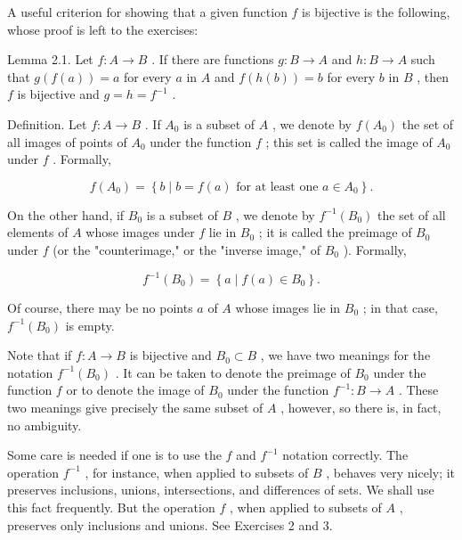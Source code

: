 A useful criterion for showing that a given function \(f\) is bijective is the following, whose proof is left to the exercises:

Lemma 2.1. Let \(f : A \rightarrow  B\) . If there are functions \(g : B \rightarrow  A\) and \(h : B \rightarrow  A\) such that \(g\left( {f\left( a\right) }\right)  = a\) for every \(a\) in \(A\) and \(f\left( {h\left( b\right) }\right)  = b\) for every \(b\) in \(B\) , then \(f\) is bijective and \(g = h = {f}^{-1}\) .

Definition. Let \(f : A \rightarrow  B\) . If \({A}_{0}\) is a subset of \(A\) , we denote by \(f\left( {A}_{0}\right)\) the set of all images of points of \({A}_{0}\) under the function \(f\) ; this set is called the image of \({A}_{0}\) under \(f\) . Formally,

\[
f\left( {A}_{0}\right)  = \left\{  {b \mid  b = f\left( a\right) \text{ for at least one }a \in  {A}_{0}}\right\}  .
\]

On the other hand, if \({B}_{0}\) is a subset of \(B\) , we denote by \({f}^{-1}\left( {B}_{0}\right)\) the set of all elements of \(A\) whose images under \(f\) lie in \({B}_{0}\) ; it is called the preimage of \({B}_{0}\) under \(f\) (or the "counterimage," or the "inverse image," of \({B}_{0}\) ). Formally,

\[
{f}^{-1}\left( {B}_{0}\right)  = \left\{  {a \mid  f\left( a\right)  \in  {B}_{0}}\right\}  .
\]

Of course, there may be no points \(a\) of \(A\) whose images lie in \({B}_{0}\) ; in that case, \({f}^{-1}\left( {B}_{0}\right)\) is empty.

Note that if \(f : A \rightarrow  B\) is bijective and \({B}_{0} \subset  B\) , we have two meanings for the notation \({f}^{-1}\left( {B}_{0}\right)\) . It can be taken to denote the preimage of \({B}_{0}\) under the function \(f\) or to denote the image of \({B}_{0}\) under the function \({f}^{-1} : B \rightarrow  A\) . These two meanings give precisely the same subset of \(A\) , however, so there is, in fact, no ambiguity.

Some care is needed if one is to use the \(f\) and \({f}^{-1}\) notation correctly. The operation \({f}^{-1}\) , for instance, when applied to subsets of \(B\) , behaves very nicely; it preserves inclusions, unions, intersections, and differences of sets. We shall use this fact frequently. But the operation \(f\) , when applied to subsets of \(A\) , preserves only inclusions and unions. See Exercises 2 and 3.


